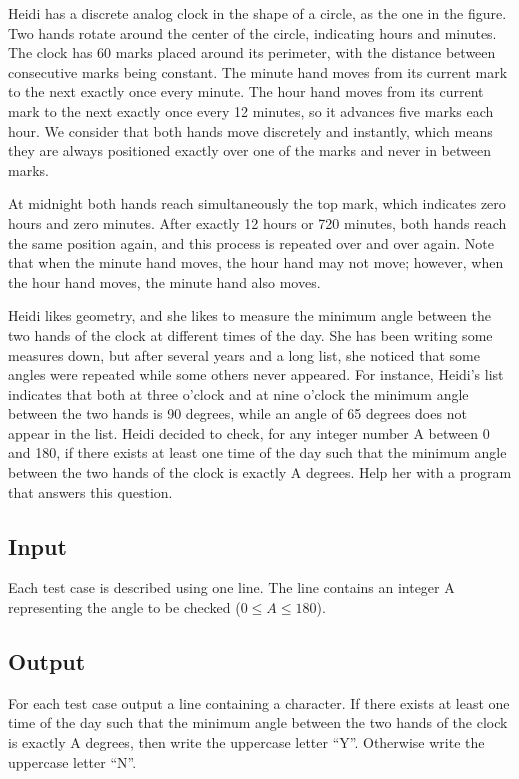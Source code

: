 Heidi has a discrete analog clock in the shape of a circle, as the one in
the figure. Two hands rotate around the center of the circle, indicating
hours and minutes. The clock has 60 marks placed around its perimeter, with
the distance between consecutive marks being constant. The minute hand moves
from its current mark to the next exactly once every minute. The hour hand
moves from its current mark to the next exactly once every 12 minutes, so it
advances five marks each hour. We consider that both hands move discretely
and instantly, which means they are always positioned exactly over one of
the marks and never in between marks.

At midnight both hands reach simultaneously the top mark, which indicates
zero hours and zero minutes. After exactly 12 hours or 720 minutes, both
hands reach the same position again, and this process is repeated over and
over again. Note that when the minute hand moves, the hour hand may not
move; however, when the hour hand moves, the minute hand also moves.

Heidi likes geometry, and she likes to measure the minimum angle between the
two hands of the clock at different times of the day. She has been writing
some measures down, but after several years and a long list, she noticed
that some angles were repeated while some others never appeared. For
instance, Heidi’s list indicates that both at three o’clock and at nine
o’clock the minimum angle between the two hands is 90 degrees, while an
angle of 65 degrees does not appear in the list. Heidi decided to check, for
any integer number A between 0 and 180, if there exists at least one time of
the day such that the minimum angle between the two hands of the clock is
exactly A degrees. Help her with a program that answers this question.

\subsection*{Input}
Each test case is described using one line. The line contains an integer A
representing the angle to be checked ($0 \le A \le 180$).

\subsection*{Output}
For each test case output a line containing a character. If there exists at
least one time of the day such that the minimum angle between the two hands
of the clock is exactly A degrees, then write the uppercase letter “Y”.
Otherwise write the uppercase letter “N”.

